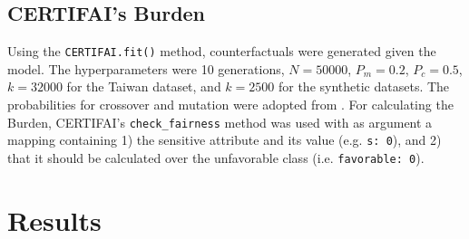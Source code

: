 \documentclass[runningheads]{llncs}
\begin{document}
\subsection{CERTIFAI's Burden}\label{sec:certifai}
Using the \texttt{CERTIFAI.fit()} method, counterfactuals were generated given the model. The hyperparameters were 10 generations, $N=50000$, $P_m = 0.2$, $P_c = 0.5$, $k=32000$ for the Taiwan dataset, and $k=2500$ for the synthetic datasets. The probabilities for crossover and mutation were adopted from \cite{certifai}. For calculating the Burden, CERTIFAI's \texttt{check\_fairness} method was used with as argument a mapping containing 1) the 
sensitive attribute and its value (e.g. \texttt{s: 0}), and 2) that it should be calculated over the unfavorable class (i.e. \texttt{favorable: 0}).

\section{Results}\label{sec:results}
\end{document}
